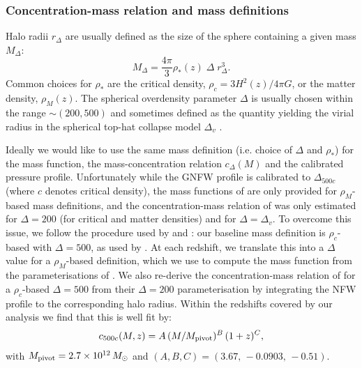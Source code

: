\documentclass[useAMS,usenatbib]{mn2e}
\begin{document}
    \subsubsection{Concentration-mass relation and mass definitions}\label{sssec:theory.hm.cm}
      Halo radii $r_\Delta$ are usually defined as the size of the sphere containing a given mass $M_\Delta$:
      \begin{equation}
        M_\Delta = \frac{4\pi}{3}\rho_*(z) \; \Delta \; r^3_\Delta.
      \end{equation}
      Common choices for $\rho_*$ are the critical density, $\rho_c=3H^2(z)/4\pi G$, or the matter density, $\rho_M(z)$. The spherical overdensity parameter $\Delta$ is usually chosen within the range $\sim(200,500)$ and sometimes defined as the quantity yielding the virial radius in the spherical top-hat collapse model $\Delta_v$ \citep{1998ApJ...495...80B}.

      Ideally we would like to use the same mass definition (i.e. choice of $\Delta$ and $\rho_*$) for the mass function, the mass-concentration relation $c_\Delta(M)$ and the calibrated pressure profile. Unfortunately while the GNFW profile is calibrated to $\Delta_{500c}$ (where $c$ denotes critical density), the mass functions of \cite{2008ApJ...688..709T,2010ApJ...724..878T} are only provided for $\rho_M$-based mass definitions, and the concentration-mass relation of \cite{2008MNRAS.390L..64D} was only estimated for $\Delta=200$ (for critical and matter densities) and for $\Delta=\Delta_v$. To overcome this issue, we follow the procedure used by \cite{2016A&A...594A..24P} and \cite{2018MNRAS.477.4957B}: our baseline mass definition is $\rho_c$-based with $\Delta=500$, as used by \cite{2010A&A...517A..92A}. At each redshift, we translate this into a $\Delta$ value for a $\rho_M$-based definition, which we use to compute the mass function from the parameterisations of \cite{2008ApJ...688..709T,2010ApJ...724..878T}. We also re-derive the concentration-mass relation of \cite{2008MNRAS.390L..64D} for a $\rho_c$-based $\Delta=500$ from their $\Delta=200$ parameterisation by integrating the NFW profile to the corresponding halo radius. Within the redshifts covered by our analysis we find that this is well fit by:
      \begin{equation}
        c_{500c}(M,z)= A\,(M/M_{\rm pivot})^B\,(1+z)^C,
      \end{equation}
      with $M_{\rm pivot}=2.7\times10^{12}\,M_\odot$ and $(A,B,C)=(3.67,\,-0.0903,\,-0.51)$.
\end{document}
